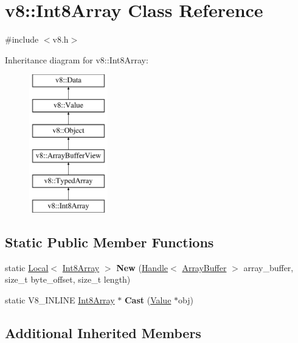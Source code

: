\hypertarget{classv8_1_1Int8Array}{\section{v8\-:\-:Int8\-Array Class Reference}
\label{classv8_1_1Int8Array}
}


{\ttfamily \#include $<$v8.\-h$>$}

Inheritance diagram for v8\-:\-:Int8\-Array\-:\begin{figure}[H]
\begin{center}
\leavevmode
\includegraphics[height=6.000000cm]{classv8_1_1Int8Array}
\end{center}
\end{figure}
\subsection*{Static Public Member Functions}
\begin{DoxyCompactItemize}
\item 
\hypertarget{classv8_1_1Int8Array_a40454c011895180c803650ba7294139b}{static \hyperlink{classv8_1_1Local}{Local}$<$ \hyperlink{classv8_1_1Int8Array}{Int8\-Array} $>$ {\bfseries New} (\hyperlink{classv8_1_1Handle}{Handle}$<$ \hyperlink{classv8_1_1ArrayBuffer}{Array\-Buffer} $>$ array\-\_\-buffer, size\-\_\-t byte\-\_\-offset, size\-\_\-t length)}\label{classv8_1_1Int8Array_a40454c011895180c803650ba7294139b}

\item 
\hypertarget{classv8_1_1Int8Array_a201a6b46e2cc455830d62c57bc8b4a3e}{static V8\-\_\-\-I\-N\-L\-I\-N\-E \hyperlink{classv8_1_1Int8Array}{Int8\-Array} $\ast$ {\bfseries Cast} (\hyperlink{classv8_1_1Value}{Value} $\ast$obj)}\label{classv8_1_1Int8Array_a201a6b46e2cc455830d62c57bc8b4a3e}

\end{DoxyCompactItemize}
\subsection*{Additional Inherited Members}



